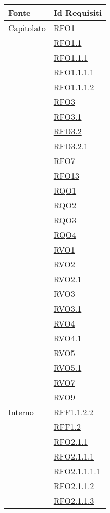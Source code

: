 \normalsize
\begin{longtable}{|>{\centering}m{5cm}|m{5cm}<{\centering}|}
\hline
\textbf{Fonte} & \textbf{Id Requisiti}\\
\hline
\endhead
\hyperlink{Capitolato}{Capitolato} & \hyperlink{RFO1}{RFO1}\\
& \hyperlink{RFO1.1}{RFO1.1}\\
& \hyperlink{RFO1.1.1}{RFO1.1.1}\\
& \hyperlink{RFO1.1.1.1}{RFO1.1.1.1}\\
& \hyperlink{RFO1.1.1.2}{RFO1.1.1.2}\\
& \hyperlink{RFO3}{RFO3}\\
& \hyperlink{RFO3.1}{RFO3.1}\\
& \hyperlink{RFD3.2}{RFD3.2}\\
& \hyperlink{RFD3.2.1}{RFD3.2.1}\\
& \hyperlink{RFO7}{RFO7}\\
& \hyperlink{RFO13}{RFO13}\\
& \hyperlink{RQO1}{RQO1}\\
& \hyperlink{RQO2}{RQO2}\\
& \hyperlink{RQO3}{RQO3}\\
& \hyperlink{RQO4}{RQO4}\\
& \hyperlink{RVO1}{RVO1}\\
& \hyperlink{RVO2}{RVO2}\\
& \hyperlink{RVO2.1}{RVO2.1}\\
& \hyperlink{RVO3}{RVO3}\\
& \hyperlink{RVO3.1}{RVO3.1}\\
& \hyperlink{RVO4}{RVO4}\\
& \hyperlink{RVO4.1}{RVO4.1}\\
& \hyperlink{RVO5}{RVO5}\\
& \hyperlink{RVO5.1}{RVO5.1}\\
& \hyperlink{RVO7}{RVO7}\\
& \hyperlink{RVO9}{RVO9}\\ \hline
\hyperlink{Interno}{Interno} & \hyperlink{RFF1.1.2.2}{RFF1.1.2.2}\\
& \hyperlink{RFF1.2}{RFF1.2}\\
& \hyperlink{RFO2.1.1}{RFO2.1.1}\\
& \hyperlink{RFO2.1.1.1}{RFO2.1.1.1}\\
& \hyperlink{RFO2.1.1.1.1}{RFO2.1.1.1.1}\\
& \hyperlink{RFO2.1.1.2}{RFO2.1.1.2}\\
& \hyperlink{RFO2.1.1.3}{RFO2.1.1.3}\\

\end{longtable}
